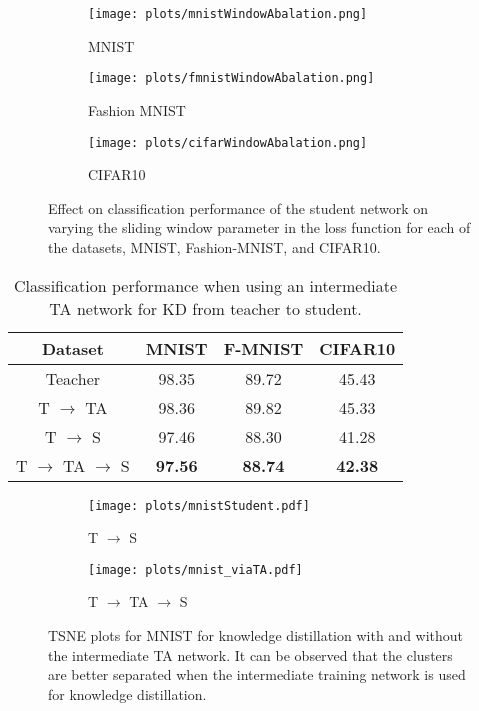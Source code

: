 \documentclass{article}
\begin{document}
\begin{figure}[!t]
\begin{center}
	\begin{subfigure}{0.48\textwidth}
	\texttt{[image: plots/mnistWindowAbalation.png]}
	\caption{MNIST}
	\end{subfigure}
	\begin{subfigure}{0.48\textwidth}
	\texttt{[image: plots/fmnistWindowAbalation.png]}
	\caption{Fashion MNIST}
	\end{subfigure}
	\begin{subfigure}{0.48\textwidth}
	\texttt{[image: plots/cifarWindowAbalation.png]}
	\caption{CIFAR10}
	\end{subfigure}
\end{center}
\caption{Effect on classification performance of the student network on varying the sliding window parameter in the loss function for each of the datasets, MNIST, Fashion-MNIST, and CIFAR10.}
\vspace{-5mm}
\label{fig:slidingWindowAbalation}
\end{figure}

\begin{table}[!t]
\caption{Classification performance when using an intermediate TA network for KD from teacher to student.}
\label{tab:taPerformance}
\centering
    \begin{tabular}{c|c c c}
    \hline \textbf{Dataset} & \textbf{MNIST} & \textbf{F-MNIST} & \textbf{CIFAR10}\\ \hline
        Teacher & 98.35 & 89.72 & 45.43 \\ \hline
        T $\rightarrow$ TA & 98.36 & 89.82 & 45.33 \\
        T $\rightarrow$ S & 97.46 & 88.30 & 41.28 \\
        T $\rightarrow$ TA $\rightarrow$ S & \textbf{97.56} & \textbf{88.74} & \textbf{42.38} \\ \hline
\end{tabular}
\end{table}

\begin{figure}[t]
\begin{center}
	\begin{subfigure}{0.48\textwidth}
	\texttt{[image: plots/mnistStudent.pdf]}
	\caption{T $\rightarrow$ S}
	\end{subfigure}
	\begin{subfigure}{0.48\textwidth}
	\texttt{[image: plots/mnist\_viaTA.pdf]}
	\caption{T $\rightarrow$ TA $\rightarrow$ S}
	\end{subfigure}
\end{center}
\caption{TSNE plots for MNIST for knowledge distillation with and without the intermediate TA network. It can be observed that the clusters are better separated when the intermediate training network is used for knowledge distillation.}
\label{fig:mnistTSNEs}
\end{figure}
\end{document}
